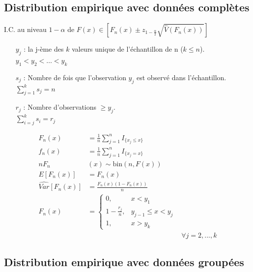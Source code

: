 \documentclass[10pt, french]{article}
\begin{document}
\begin{multicols*}{3}
\subsection*{Distribution empirique avec données complètes}

I.C. au niveau $1 - \alpha$ de $F(x) \in \left[F_n(x) \pm z_{1 - \frac{\alpha}{2}} \sqrt{\widehat{V}(F_n(x))} \right]$
\begin{enumerate}
	\item[$y_j$ : ] la j-ème des $k$ valeurs unique de l'échantillon de n ($k \le n$).\\
	$y_1 < y_2 < \dots < y_k$
	\item[$s_j$ : ] Nombre de fois que l'observation $y_j$ est observé dans l'échantillon.\\
	$\sum_{j = 1}^{k}s_j = n$
	\item[$r_j$ : ] Nombre d'observations $\ge y_j$. \\
	$\sum_{i = j}^{k}s_i = r_j$
\end{enumerate}

\begin{align*}
F_n(x) &= \frac{1}{n} \sum\limits_{j=1}^n I_{\{ x_j \leq x\}} \\
f_n(x) &= \frac{1}{n} \sum\limits_{j=1}^n I_{\{ x_j = x\}}  \\
 n F_n&(x)  \sim \text{bin}(n, F(x))\\
E[F_n(x)] &
		= F_n(x)\\
\widehat{Var}[F_n(x)] &
= \frac{F_n(x)(1 - F_n(x))}{n}  \\
F_n(x) &= 
\left\{
	\begin{array}{ll}
		0,  &  x < y_1 \\
        1 - \frac{r_j}{n}, &  y_{j-1} \leq x < y_j \\
        1, & x > y_k 
	\end{array}
\right. \\
&&\forall j=2,...,k
\end{align*}

\subsection*{Distribution empirique avec données groupées}

\end{multicols*}
\end{document}
